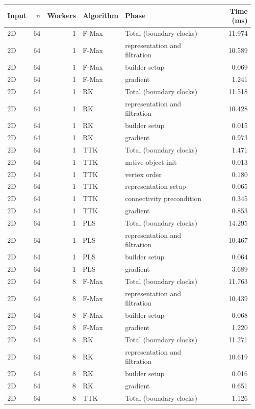 \begin{tabular}{lrrllr}
\hline
Input & $n$ & Workers & Algorithm & Phase & Time (ms) \\
\hline
2D & 64 & 1 & F-Max & Total (boundary clocks) & 11.974 \\
2D & 64 & 1 & F-Max & representation and filtration & 10.589 \\
2D & 64 & 1 & F-Max & builder setup & 0.069 \\
2D & 64 & 1 & F-Max & gradient & 1.241 \\
2D & 64 & 1 & RK & Total (boundary clocks) & 11.518 \\
2D & 64 & 1 & RK & representation and filtration & 10.428 \\
2D & 64 & 1 & RK & builder setup & 0.015 \\
2D & 64 & 1 & RK & gradient & 0.973 \\
2D & 64 & 1 & TTK & Total (boundary clocks) & 1.471 \\
2D & 64 & 1 & TTK & native object init & 0.013 \\
2D & 64 & 1 & TTK & vertex order & 0.180 \\
2D & 64 & 1 & TTK & representation setup & 0.065 \\
2D & 64 & 1 & TTK & connectivity precondition & 0.345 \\
2D & 64 & 1 & TTK & gradient & 0.853 \\
2D & 64 & 1 & PLS & Total (boundary clocks) & 14.295 \\
2D & 64 & 1 & PLS & representation and filtration & 10.467 \\
2D & 64 & 1 & PLS & builder setup & 0.064 \\
2D & 64 & 1 & PLS & gradient & 3.689 \\
2D & 64 & 8 & F-Max & Total (boundary clocks) & 11.763 \\
2D & 64 & 8 & F-Max & representation and filtration & 10.439 \\
2D & 64 & 8 & F-Max & builder setup & 0.068 \\
2D & 64 & 8 & F-Max & gradient & 1.220 \\
2D & 64 & 8 & RK & Total (boundary clocks) & 11.271 \\
2D & 64 & 8 & RK & representation and filtration & 10.619 \\
2D & 64 & 8 & RK & builder setup & 0.016 \\
2D & 64 & 8 & RK & gradient & 0.651 \\
2D & 64 & 8 & TTK & Total (boundary clocks) & 1.126 \\

\end{tabular}
